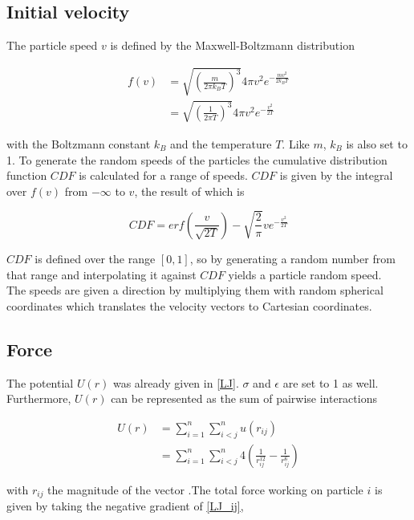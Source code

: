 \documentclass[10pt,a4paper,notitlepage]{article}
\begin{document}
\subsection{Initial velocity}\label{sec:init_vel}
The particle speed $v$ is defined by the Maxwell-Boltzmann distribution

\begin{align}\label{MBD}
f(v) &= \sqrt{\left(\frac{m}{2\pi k_B T}\right)^3}4\pi v^2 e^{-\frac{mv^2}{2k_BT}} \nonumber\\
	 &= \sqrt{\left(\frac{1}{2\pi T}\right)^3}4\pi v^2 e^{-\frac{v^2}{2T}}
\end{align}
 
 with the Boltzmann constant $k_B$  and the temperature $T$. Like $m$, $k_B$ is also set to 1. To generate the random speeds of the particles the cumulative distribution function $CDF$ is calculated for a range of speeds. $CDF$ is given by the integral over $f(v)$ from $-\infty$ to $v$, the result of which is 
 
 \begin{equation}\label{cdf}
 CDF = erf\left(\frac{v}{\sqrt{2T}}\right) - \sqrt{\frac{2}{\pi}}v e^{-\frac{v^2}{2T}}
 \end{equation}
  
  $CDF$ is defined over the range $[0,1]$, so by generating a random number from that range and interpolating it against $CDF$ yields a particle random speed.\\
  The speeds are given a direction by multiplying them with random spherical coordinates which translates the velocity vectors to Cartesian coordinates.
  
  \subsection{Force}
  The potential $U(r)$ was already given in \eqref{LJ}. $\sigma$ and $\epsilon$ are set to 1 as well. Furthermore, $U(r)$ can be represented as the sum of pairwise interactions
  
  \begin{align}\label{LJ_ij}
  U(r) &=\displaystyle\sum^n_{i=1}\displaystyle\sum^n_{i<j}u(r_{ij})  \nonumber\\
       &=\displaystyle\sum^n_{i=1}\displaystyle\sum^n_{i<j}4\left(\frac{1}{r^{12}_{ij}} - \frac{1}{r^6_{ij}}\right)
  \end{align}
  
  with $r_{ij}$ the magnitude of the vector .\unboldmath The total force working on particle $i$ is given by taking the negative gradient of \eqref{LJ_ij},
  
\end{document}
